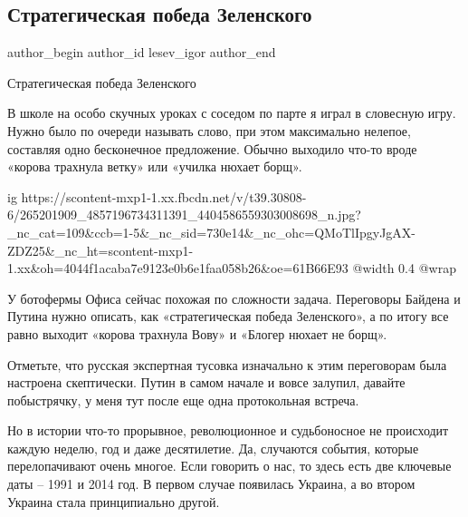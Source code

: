  
 
 
 
 
 
\subsection{Стратегическая победа Зеленского}
\label{sec:08_12_2021.fb.lesev_igor.1.strategicheskaja_pobeda_zelenskii}
 
\ifcmt
 author_begin
   author_id lesev_igor
 author_end
\fi

Стратегическая победа Зеленского

В школе на особо скучных уроках с соседом по парте я играл в словесную игру.
Нужно было по очереди называть слово, при этом максимально нелепое, составляя
одно бесконечное предложение. Обычно выходило что-то вроде «корова трахнула
ветку» или «училка нюхает борщ».

\ifcmt
  ig https://scontent-mxp1-1.xx.fbcdn.net/v/t39.30808-6/265201909_4857196734311391_4404586559303008698_n.jpg?_nc_cat=109&ccb=1-5&_nc_sid=730e14&_nc_ohc=QMoTlIpgyJgAX-ZDZ25&_nc_ht=scontent-mxp1-1.xx&oh=4044f1acaba7e9123e0b6e1faa058b26&oe=61B66E93
  @width 0.4
  @wrap 
\fi

У ботофермы Офиса сейчас похожая по сложности задача. Переговоры Байдена и
Путина нужно описать, как «стратегическая победа Зеленского», а по итогу все
равно выходит «корова трахнула Вову» и «Блогер нюхает не борщ».

Отметьте, что русская экспертная тусовка изначально к этим переговорам была
настроена скептически. Путин в самом начале и вовсе залупил, давайте
побыстрячку, у меня тут после еще одна протокольная встреча.

Но в истории что-то прорывное, революционное и судьбоносное не происходит
каждую неделю, год и даже десятилетие. Да, случаются события, которые
перелопачивают очень многое. Если говорить о нас, то здесь есть две ключевые
даты – 1991 и 2014 год. В первом случае появилась Украина, а во втором Украина
стала принципиально другой.

